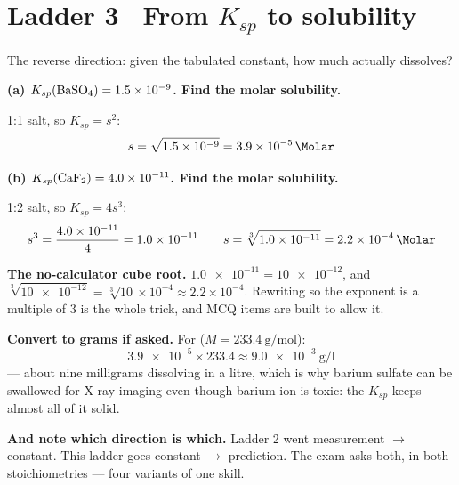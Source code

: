 \documentclass{apchem-worksheet}
\begin{document}
\section*{\sffamily Ladder 3 \textbullet\ From $K_{sp}$ to solubility}

The reverse direction: given the tabulated constant, how much actually
dissolves?

\begin{workedexample}
\textbf{(a) $K_{sp}(\ce{BaSO4}) = \num{1.5e-9}$. Find the molar
solubility.}

1:1 salt, so $K_{sp} = s^{2}$:
\[ s = \sqrt{\num{1.5e-9}} = \mathbf{\SI{3.9e-5}{\Molar}} \]

\textbf{(b) $K_{sp}(\ce{CaF2}) = \num{4.0e-11}$. Find the molar
solubility.}

1:2 salt, so $K_{sp} = 4s^{3}$:
\[ s^{3} = \frac{\num{4.0e-11}}{4} = \num{1.0e-11}
   \qquad
   s = \sqrt[3]{\num{1.0e-11}} = \mathbf{\SI{2.2e-4}{\Molar}} \]

\textbf{The no-calculator cube root.} $\num{1.0e-11} =
\num{10e-12}$, and $\sqrt[3]{\num{10e-12}} = \sqrt[3]{10} \times
10^{-4} \approx 2.2 \times 10^{-4}$. Rewriting so the exponent is a
multiple of 3 is the whole trick, and MCQ items are built to allow it.

\textbf{Convert to grams if asked.} For 
($M = \SI{233.4}{\gram\per\mole}$):
\[ \num{3.9e-5} \times 233.4 \approx \SI{9.0e-3}{\gram\per\litre} \]
--- about nine milligrams dissolving in a litre, which is why barium
sulfate can be swallowed for X-ray imaging even though barium ion is
toxic: the $K_{sp}$ keeps almost all of it solid.

\textbf{And note which direction is which.} Ladder 2 went measurement
$\to$ constant. This ladder goes constant $\to$ prediction. The exam
asks both, in both stoichiometries --- four variants of one skill.
\end{workedexample}
\end{document}
